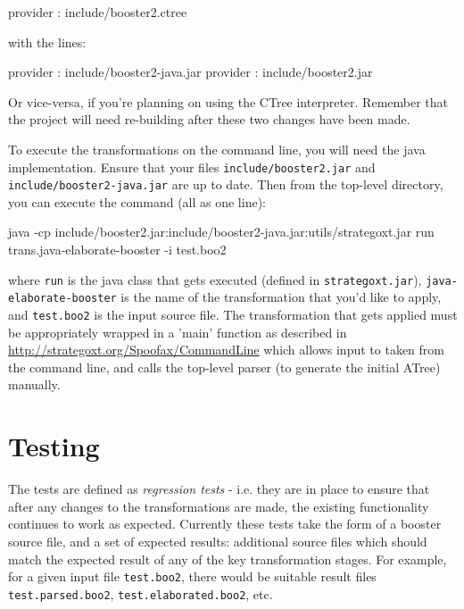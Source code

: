 \begin{code}
provider : include/booster2.ctree  
\end{code}

with the lines:

\begin{code}
provider : include/booster2-java.jar                                                                                      
provider : include/booster2.jar  
\end{code}

Or vice-versa, if you're planning on using the CTree interpreter.
Remember that the project will need re-building after these two
changes have been made.

To execute the transformations on the command line, you will need the
java implementation.  Ensure that your files
\verb|include/booster2.jar| and \verb|include/booster2-java.jar| are
up to date.  Then from the top-level directory, you can execute the
command (all as one line):

\begin{code}
java -cp 
include/booster2.jar:include/booster2-java.jar:utils/strategoxt.jar
run trans.java-elaborate-booster -i test.boo2
\end{code}

where \verb|run| is the java class that gets executed (defined in
\verb|strategoxt.jar|), \verb|java-elaborate-booster| is the name of
the transformation that you'd like to apply, and \verb|test.boo2| is
the input source file.  The transformation that gets applied must be
appropriately wrapped in a 'main' function as described in
\url{http://strategoxt.org/Spoofax/CommandLine} which allows input to
taken from the command line, and calls the top-level parser (to
generate the initial ATree) manually. 

\section{Testing}

The tests are defined as \emph{regression tests} - i.e. they are in
place to ensure that after any changes to the transformations are
made, the existing functionality continues to work as expected.
Currently these tests take the form of a booster source file, and a
set of expected results: additional source files which should match
the expected result of any of the key transformation stages.  For
example, for a given input file \verb|test.boo2|, there would be
suitable result files \verb|test.parsed.boo2|,
\verb|test.elaborated.boo2|, etc.

